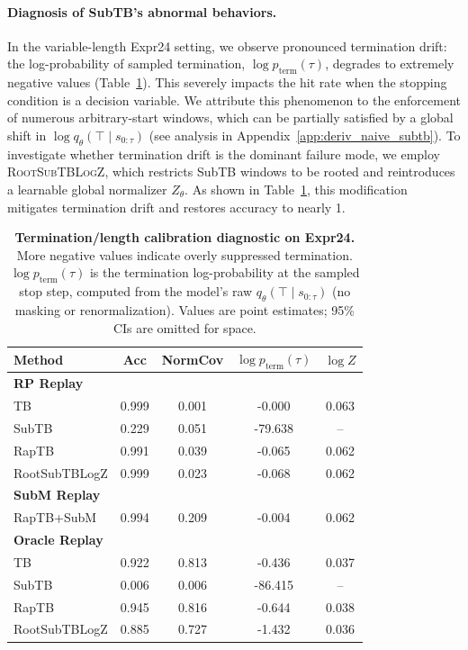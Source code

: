 \documentclass{article}
\theoremstyle{plain}
\theoremstyle{definition}
\theoremstyle{remark}
\begin{document}
\paragraph{Diagnosis of SubTB's abnormal behaviors.}
\label{sec:why_subtb_abnormal}
In the variable-length Expr24 setting, we observe pronounced termination drift: the log-probability of sampled termination, $\log p_{\text{term}}(\tau)$, degrades to extremely negative values (Table~\ref{tab:expr24_json_metrics}). This severely impacts the hit rate when the stopping condition is a decision variable. We attribute this phenomenon to the enforcement of numerous arbitrary-start windows, which can be partially satisfied by a global shift in $\log q_\theta(\top\mid s_{0:\tau})$ (see analysis in Appendix~\ref{app:deriv_naive_subtb}). To investigate whether termination drift is the dominant failure mode, we employ \textsc{RootSubTBLogZ}, which restricts SubTB windows to be rooted and reintroduces a learnable global normalizer $Z_\theta$. As shown in Table~\ref{tab:expr24_json_metrics}, this modification mitigates termination drift and restores accuracy to nearly 1.

\begin{table}[t]
\centering
\small
\setlength{\tabcolsep}{5pt}
\renewcommand{\arraystretch}{1.05}
\caption{\textbf{Termination/length calibration diagnostic on Expr24.}
More negative values indicate overly suppressed termination.
$\log p_{\text{term}}(\tau)$ is the termination log-probability at the sampled stop step, computed from the model's raw $q_\theta(\top\mid s_{0:\tau})$ (no masking or renormalization). Values are point estimates; 95\% CIs are omitted for space.}
\label{tab:expr24_json_metrics}
\begin{tabular}{lcccc}
\toprule
Method & Acc & NormCov & $\log p_{\text{term}}(\tau)$ & $\log Z$ \\
\midrule
\multicolumn{5}{l}{\textbf{RP Replay}}\\
TB & 0.999 & 0.001 & -0.000  & 0.063 \\
\rowcolor{rowgray} SubTB & 0.229 & 0.051 & -79.638   & -- \\
RapTB & 0.991 & 0.039 & -0.065  & 0.062 \\
\rowcolor{rowgray} RootSubTBLogZ & 0.999 & 0.023 & -0.068  & 0.062 \\
\midrule
\multicolumn{5}{l}{\textbf{SubM Replay}}\\
RapTB+SubM & 0.994 & 0.209 & -0.004   & 0.062 \\
\midrule
\multicolumn{5}{l}{\textbf{Oracle Replay}}\\
TB & 0.922 & 0.813 & -0.436  & 0.037 \\
\rowcolor{rowgray} SubTB & 0.006 & 0.006 & -86.415   & -- \\
RapTB & 0.945 & 0.816 & -0.644  & 0.038 \\
\rowcolor{rowgray} RootSubTBLogZ & 0.885 & 0.727 & -1.432   & 0.036 \\
\bottomrule
\end{tabular}
\end{table}
\end{document}
